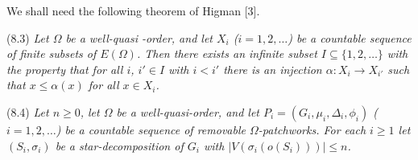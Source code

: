 We shall need the following theorem of Higman [3].

\stmt
(8.3) \textit{Let $\Omega$ be a well-quasi -order, and let $X_i$ ($i = 1, 2, \dots$) be a countable sequence of finite subsets of $E(\Omega)$. Then there exists an infinite subset $I \subseteq \{1, 2, \dots\}$ with the property that for all $i$, $i' \in I$ with $i < i'$ there is an injection $\alpha \colon X_i \to X_{i'}$ such that $x \le \alpha(x)$ for all $x \in X_i$.}

\stmt
(8.4) \textit{Let $n \ge 0$, let $\Omega$ be a well-quasi-order, and let $P_i = (G_i, \mu_i, \Delta_i, \phi_i)$ ($i = 1, 2, \dots$) be a countable sequence of removable $\Omega$-patchworks. For each $i \ge 1$ let $(S_i, \sigma_i)$ be a star-decomposition of $G_i$ with $|V(\sigma_i(o(S_i)))| \le n$.}
